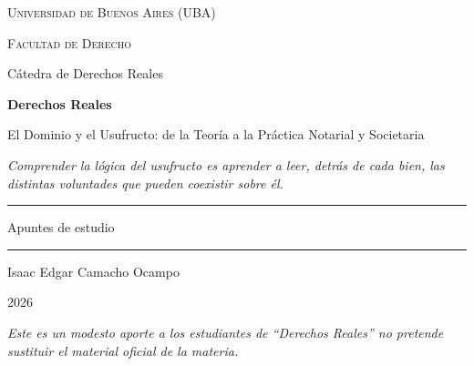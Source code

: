 \documentclass[12pt,oneside]{book}
\newcommand{\universidad}{Universidad de Buenos Aires (UBA)}
\newcommand{\facultad}{Facultad de Derecho}
\newcommand{\catedra}{Cátedra de Derechos Reales}
\newcommand{\materia}{Derechos Reales}
\newcommand{\titulodoc}{El Dominio y el Usufructo: de la Teoría a la Práctica Notarial y Societaria}
\newcommand{\autor}{Isaac Edgar Camacho Ocampo}
\newcommand{\anio}{2026}
\begin{document}
\begin{titlepage}
\thispagestyle{empty}

\begin{center}

\vspace*{1cm}

{\large \textsc{\universidad}}

\vspace{0.2cm}

{\large \textsc{\facultad}}

\vspace{0.2cm}

{\large \catedra}

\vspace{3cm}

{\Huge \textbf{\materia}}

\vspace{1cm}

{\LARGE \titulodoc}

\vspace{0.8cm}

\textit{Comprender la lógica del usufructo es aprender a leer, detrás de cada bien, las distintas voluntades que pueden coexistir sobre él.}

\vspace{1.2cm}

\rule{0.70\textwidth}{0.5pt}

\vspace{0.5cm}

{\large Apuntes de estudio}

\vspace{0.5cm}

\rule{0.70\textwidth}{0.5pt}

\vfill

{\large \autor}

\vspace{0.3cm}

{\large \anio}

\end{center}

\vfill

\begin{flushleft}
\textit{Este es un modesto aporte a los estudiantes de ``Derechos Reales'' no pretende sustituir el material oficial de la materia.}
\end{flushleft}

\end{titlepage}
\end{document}
